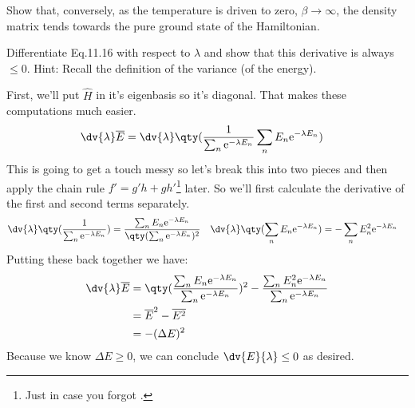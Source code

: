\documentclass[boxes,pages]{homework}
\makeatletter
\newcommand{\e}{\mathrm{e}}
\numberwithin{@problem}{section}
\makeatother
\begin{document}
\setcounter{section}{11}

\begin{problem}
Show that, conversely, as the temperature is driven to zero, $\beta\to\infty$, the density matrix tends towards the pure ground state of the Hamiltonian.
\end{problem}

\begin{solution}

\end{solution}

\begin{problem}
Differentiate Eq.11.16 with respect to $\lambda$ and show that  this derivative is always $\leq 0$. Hint: Recall the definition of the variance (of the energy).
\end{problem}

\begin{solution}
	First, we'll put $\hat{H}$ in it's eigenbasis so it's diagonal. That makes these computations much easier.
	\begin{align*}
		\dv{\lambda}\overline{E} & = \dv{\lambda}\qty(\frac{1}{\sum_n\e^{-\lambda E_n}}\sum_n E_n\e^{-\lambda E_n})
	\end{align*}
	This is going to get a touch messy so let's break this into two pieces and then apply the chain rule $f' = g'h + gh'$\footnote{Just in case you forgot \Winkey.} later. So we'll first calculate the derivative of the first and second terms separately.
	\begin{align*}
		\dv{\lambda}\qty(\frac{1}{\sum_n\e^{-\lambda E_n}}) & = \frac{\sum_n E_n\e^{-\lambda E_n}}{\qty(\sum_n\e^{-\lambda E_n})^2} & \dv{\lambda}\qty(\sum_n E_n\e^{-\lambda E_n}) & = -\sum_n E_n^2\e^{-\lambda E_n}
	\end{align*}
	Putting these back together we have:
	\begin{align*}
		\dv{\lambda}\overline{E} & =\qty(\frac{\sum_n E_n\e^{-\lambda E_n}}{\sum_n\e^{-\lambda E_n}})^2 - \frac{\sum_n E_n^2\e^{-\lambda E_n}}{\sum_n\e^{-\lambda E_n}} \\
		                         & = \overline{E}^2 - \overline{E^2}                                                                                                    \\
		                         & = -(\Delta E)^2
	\end{align*}
	Because we know $\Delta E \geq 0$, we can conclude $\dv{E}{\lambda} \leq 0$ as desired.
\end{solution}
\end{document}
